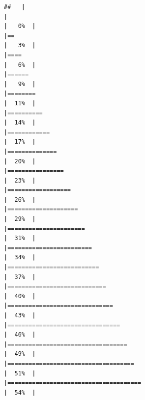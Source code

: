\documentclass[
]{article}
\begin{document}
\begin{verbatim}
##   |                                                                              |                                                                      |   0%  |                                                                              |==                                                                    |   3%  |                                                                              |====                                                                  |   6%  |                                                                              |======                                                                |   9%  |                                                                              |========                                                              |  11%  |                                                                              |==========                                                            |  14%  |                                                                              |============                                                          |  17%  |                                                                              |==============                                                        |  20%  |                                                                              |================                                                      |  23%  |                                                                              |==================                                                    |  26%  |                                                                              |====================                                                  |  29%  |                                                                              |======================                                                |  31%  |                                                                              |========================                                              |  34%  |                                                                              |==========================                                            |  37%  |                                                                              |============================                                          |  40%  |                                                                              |==============================                                        |  43%  |                                                                              |================================                                      |  46%  |                                                                              |==================================                                    |  49%  |                                                                              |====================================                                  |  51%  |                                                                              |======================================                                |  54%  |                                                                              
\end{verbatim}
\end{document}

